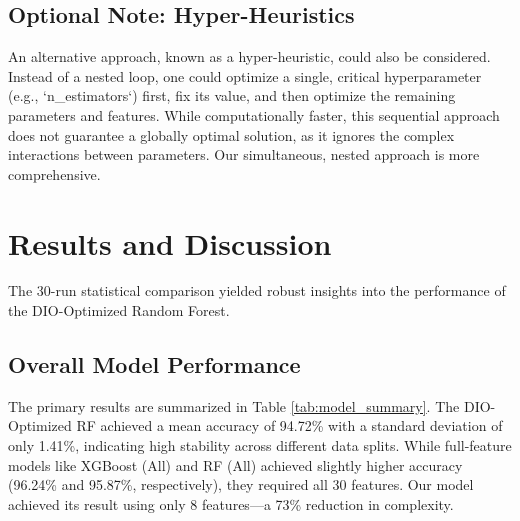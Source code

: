 \documentclass[12pt, a4paper]{article}
\begin{document}
\subsection{Optional Note: Hyper-Heuristics}
An alternative approach, known as a hyper-heuristic, could also be considered. Instead of a nested loop, one could optimize a single, critical hyperparameter (e.g., `n_estimators`) first, fix its value, and then optimize the remaining parameters and features. While computationally faster, this sequential approach does not guarantee a globally optimal solution, as it ignores the complex interactions between parameters. Our simultaneous, nested approach is more comprehensive.

\section{Results and Discussion}

The 30-run statistical comparison yielded robust insights into the performance of the DIO-Optimized Random Forest.

\subsection{Overall Model Performance}
The primary results are summarized in Table \ref{tab:model_summary}. The DIO-Optimized RF achieved a mean accuracy of 94.72\% with a standard deviation of only 1.41\%, indicating high stability across different data splits. While full-feature models like XGBoost (All) and RF (All) achieved slightly higher accuracy (96.24\% and 95.87\%, respectively), they required all 30 features. Our model achieved its result using only 8 features—a 73\% reduction in complexity.

\begin{table}[H]
    \centering
    \caption{Model Performance Summary over 30 Runs (Top 5 and DIO)}
    \label{tab:model_summary}
\end{table}
\end{document}
